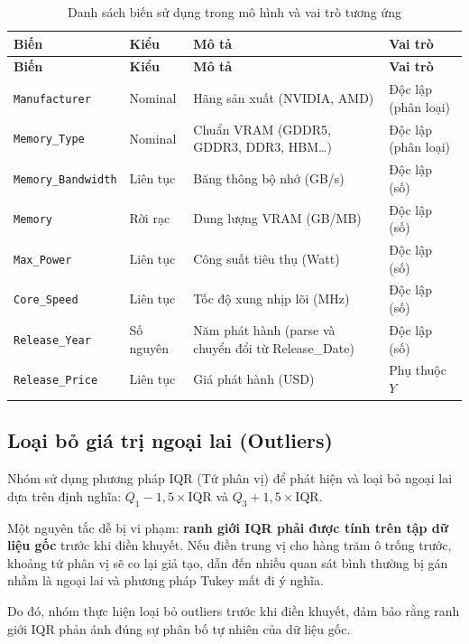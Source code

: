 \renewcommand{\arraystretch}{1.1}
\small
\setlength\LTleft{\fill}
\setlength\LTright{\fill}
\begin{longtable}{|l|l|p{5.5cm}|l|}
\caption{Danh sách biến sử dụng trong mô hình và vai trò tương ứng}
\label{tab:bien} \\
\hline
\textbf{Biến} & \textbf{Kiểu} & \textbf{Mô tả} & \textbf{Vai trò} \\
\hline
\endfirsthead
\hline
\textbf{Biến} & \textbf{Kiểu} & \textbf{Mô tả} & \textbf{Vai trò} \\
\hline
\endhead
\hline
\endlastfoot
\texttt{Manufacturer} & Nominal & Hãng sản xuất (NVIDIA, AMD) & Độc lập (phân loại) \\
\texttt{Memory\_Type} & Nominal & Chuẩn VRAM (GDDR5, GDDR3, DDR3, HBM\ldots) & Độc lập (phân loại) \\
\texttt{Memory\_Bandwidth} & Liên tục & Băng thông bộ nhớ (GB/s) & Độc lập (số) \\
\texttt{Memory} & Rời rạc & Dung lượng VRAM (GB/MB) & Độc lập (số) \\
\texttt{Max\_Power} & Liên tục & Công suất tiêu thụ (Watt) & Độc lập (số) \\
\texttt{Core\_Speed} & Liên tục & Tốc độ xung nhịp lõi (MHz) & Độc lập (số) \\
\texttt{Release\_Year} & Số nguyên & Năm phát hành (parse và chuyển đổi từ Release\_Date) & Độc lập (số) \\
\texttt{Release\_Price} & Liên tục & Giá phát hành (USD) & Phụ thuộc $Y$ \\
\hline
\end{longtable}
\normalsize

\subsection{Loại bỏ giá trị ngoại lai (Outliers)}

Nhóm sử dụng phương pháp IQR (Tứ phân vị) để phát hiện và loại bỏ ngoại lai dựa trên định nghĩa: $Q_1 - 1{,}5 \times \mathrm{IQR}$ và $Q_3 + 1{,}5 \times \mathrm{IQR}$.

Một nguyên tắc dễ bị vi phạm: \textbf{ranh giới IQR phải được tính trên tập dữ liệu gốc} trước khi điền khuyết. Nếu điền trung vị cho hàng trăm ô trống trước, khoảng tứ phân vị sẽ co lại giả tạo, dẫn đến nhiều quan sát bình thường bị gán nhầm là ngoại lai và phương pháp Tukey mất đi ý nghĩa.

Do đó, nhóm thực hiện loại bỏ outliers trước khi điền khuyết, đảm bảo rằng ranh giới IQR phản ánh đúng sự phân bố tự nhiên của dữ liệu gốc.

